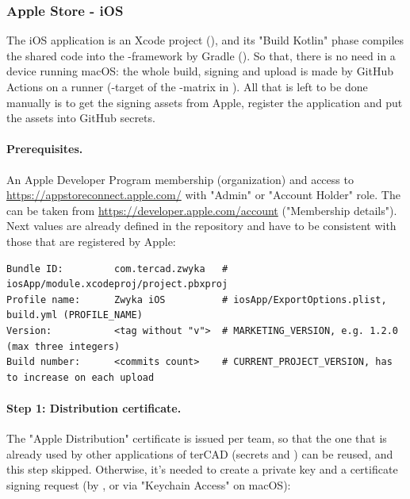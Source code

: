 
\subsubsection{Apple Store - iOS} \label{d-ios}

The iOS application is an Xcode project (), and its "Build Kotlin" phase compiles the shared
code into the -framework by Gradle (). So that, there is no need in a device running macOS:
the whole build, signing and upload is made by GitHub Actions on a  runner (-target of the -matrix in
). All that is left to be done manually is to get the signing assets from Apple, register
the application and put the assets into GitHub secrets.

\paragraph{Prerequisites.} An Apple Developer Program membership (organization) and access to
\href{https://appstoreconnect.apple.com/}{https://appstoreconnect.apple.com/} with "Admin" or "Account Holder" role. The
 can be taken from \href{https://developer.apple.com/account}{https://developer.apple.com/account} ("Membership
details"). Next values are already defined in the repository and have to be consistent with those that are registered
by Apple:

\begin{lstlisting}[language=terminal]
Bundle ID:         com.tercad.zwyka   # iosApp/module.xcodeproj/project.pbxproj
Profile name:      Zwyka iOS          # iosApp/ExportOptions.plist, build.yml (PROFILE_NAME)
Version:           <tag without "v">  # MARKETING_VERSION, e.g. 1.2.0 (max three integers)
Build number:      <commits count>    # CURRENT_PROJECT_VERSION, has to increase on each upload
\end{lstlisting}

\paragraph{Step 1: Distribution certificate.} The "Apple Distribution" certificate is issued per team, so that the one
that is already used by other applications of terCAD (secrets  and ) can be reused, and
this step skipped. Otherwise, it's needed to create a private key and a certificate signing request (by , or
via "Keychain Access" on macOS):

